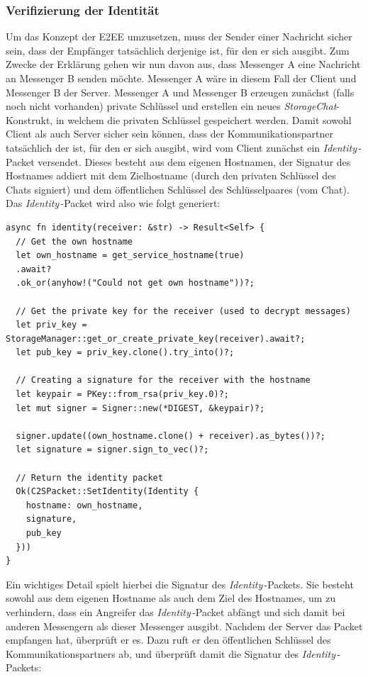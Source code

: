 \documentclass[a4paper,ngerman, headheight=28pt,12pt, footheight=27pt]{scrartcl}
\newcommand{\identity}{\textit{Identity\,}}
\begin{document}
\subsubsection{Verifizierung der Identität}
Um das Konzept der E2EE umzusetzen, muss der Sender einer Nachricht sicher sein, dass der Empfänger tatsächlich derjenige ist, für den er sich ausgibt. Zum Zwecke der Erklärung gehen wir nun davon aus, dass Messenger A eine Nachricht an Messenger B senden möchte. Messenger A wäre in diesem Fall der Client und Messenger B der Server.
Messenger A und Messenger B erzeugen zunächst (falls noch nicht vorhanden) private Schlüssel und erstellen ein neues \textit{StorageChat}-Konstrukt, in welchem die privaten Schlüssel gespeichert werden.
Damit sowohl Client als auch Server sicher sein können, dass der Kommunikationspartner tatsächlich der ist, für den er sich ausgibt, wird vom Client zunächst ein \identity-Packet versendet.
Dieses besteht aus dem eigenen Hostnamen, der Signatur des Hostnames addiert mit dem Zielhostname (durch den privaten Schlüssel des Chats signiert) und dem öffentlichen Schlüssel des Schlüsselpaares (vom Chat). Das \identity-Packet wird also wie folgt generiert:
\begin{verbatim}
async fn identity(receiver: &str) -> Result<Self> {
  // Get the own hostname
  let own_hostname = get_service_hostname(true)
  .await?
  .ok_or(anyhow!("Could not get own hostname"))?;

  // Get the private key for the receiver (used to decrypt messages)
  let priv_key = StorageManager::get_or_create_private_key(receiver).await?;
  let pub_key = priv_key.clone().try_into()?;

  // Creating a signature for the receiver with the hostname
  let keypair = PKey::from_rsa(priv_key.0)?;
  let mut signer = Signer::new(*DIGEST, &keypair)?;

  signer.update((own_hostname.clone() + receiver).as_bytes())?;
  let signature = signer.sign_to_vec()?;

  // Return the identity packet
  Ok(C2SPacket::SetIdentity(Identity {
    hostname: own_hostname,
    signature,
    pub_key
  }))
}
\end{verbatim}
Ein wichtiges Detail spielt hierbei die Signatur des \identity-Packets. Sie besteht sowohl aus dem eigenen Hostname als auch dem Ziel des Hostnames, um zu verhindern, dass ein Angreifer das \identity-Packet abfängt und sich damit bei anderen Messengern als dieser Messenger ausgibt.
Nachdem der Server das Packet empfangen hat, überprüft er es. Dazu ruft er den öffentlichen Schlüssel des Kommunikationspartners ab, und überprüft damit die Signatur des \identity-Packets:
\end{document}
